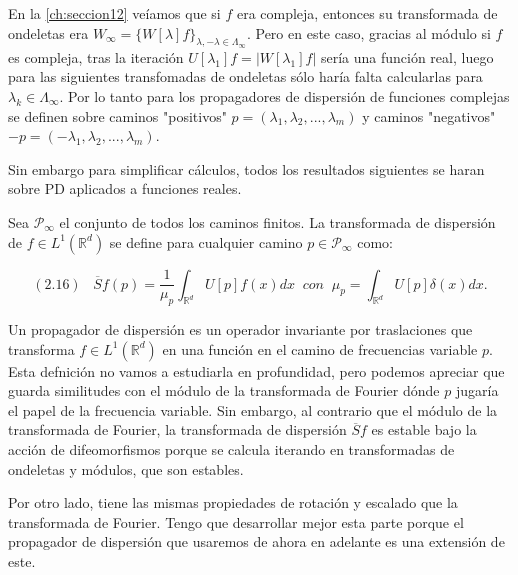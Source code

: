 \medskip

\noindent En la \autoref{ch:seccion12} veíamos que si $f$ era compleja, entonces su transformada de ondeletas era $ W_\infty=\lbrace W[\lambda]f \rbrace_{\lambda , -\lambda  \in \Lambda_{\infty} }$. Pero en este caso, gracias al módulo si $f$ es compleja, tras la iteración $U[\lambda_1]f=\left|W[\lambda_1]f\right|$ sería una función real, luego para las siguientes transfomadas de ondeletas sólo haría falta calcularlas para $\lambda_k \in \Lambda_\infty$. Por lo tanto para los propagadores de dispersión de funciones complejas se definen sobre caminos "positivos" $p=(\lambda_1,\lambda_2, ... , \lambda_m)$ y caminos "negativos" $-p=(-\lambda_1,\lambda_2, ... , \lambda_m)$.

\medskip

\noindent Sin embargo para simplificar cálculos, todos los resultados siguientes se haran sobre PD aplicados a funciones reales.

\begin{definicion}
Sea $\mathcal{P}_\infty$ el conjunto de todos los caminos finitos. La transformada de dispersión de $f \in L^1(\mathbb{R}^d)$ se define para cualquier camino $p \in \mathcal{P}_\infty$ como:

$$(2.16) \; \; \; \overline{S}f(p)=\frac{1}{\mu_p} \int_{\mathbb{R}^d}U[p]f(x)dx \; \; con \; \; \mu_p=\int_{\mathbb{R}^d} U[p] \delta(x)dx .$$
\end{definicion}

\medskip

\noindent Un propagador de dispersión es un operador invariante por traslaciones que transforma $f \in L^1(\mathbb{R}^d)$ en una función en el camino de frecuencias variable $p$. Esta defnición no vamos a estudiarla en profundidad, pero podemos apreciar que guarda similitudes con el módulo de la transformada de Fourier dónde $p$ jugaría el papel de la frecuencia variable. Sin embargo, al contrario que el módulo de la transformada de Fourier, la transformada de dispersión $\overline{S}f$ es estable bajo la acción de difeomorfismos porque se calcula iterando en transformadas de ondeletas y módulos, que son estables. 

\medskip

\noindent Por otro lado, tiene las mismas propiedades de rotación y escalado que la transformada de Fourier. Tengo que desarrollar mejor esta parte porque el propagador de dispersión que usaremos de ahora en adelante es una extensión de este.


\medskip

